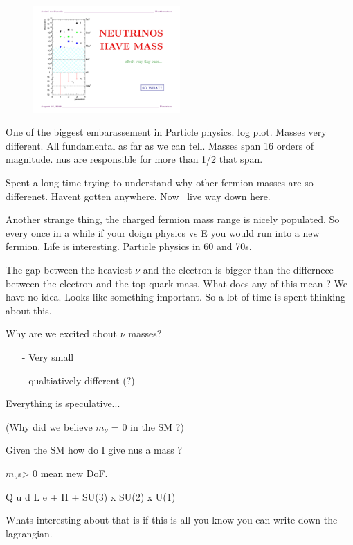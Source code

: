 {\begin{figure}[h!]
\centering
\includegraphics[width=0.5\textwidth]{./NuMass2.pdf}
\end{figure}


One of the biggest embarassement in Particle physics. 
log plot.   Masses very different. 
All fundamental as far as we can tell. 
Masses span 16 orders of magnitude. 
nus are responsible for more than 1/2 that span. 

Spent a long time trying to understand why other fermion masses are so differenet. 
Havent gotten anywhere. 
Now \nus\ live way down here.

Another strange thing, the charged fermion mass range is nicely populated. 
So every once in a while if your doign physics vs E you would run into a new fermion. 
Life is interesting. 
Particle physics in 60 and 70s. 

The gap between the heaviest $\nu$ and the electron is bigger than the differnece between the electron and the top quark mass. 
What does any of this mean ? 
We have no idea.
Looks like something important.
So a lot of time is spent thinking about this.

Why are we excited about $\nu$ masses? 
\begin{itemize}
\item[-] Very small
\item[-] qualtiatively different (?)
\end{itemize}

Everything is speculative...


(Why did we believe $m_\nu$ = 0 in the SM ?)

Given the SM how do I give nus a mass ?

$m_\nu$s> 0 mean new DoF.


Q u d L e  + H + SU(3) x SU(2) x U(1)

Whats interesting about that is if this is all you know you can write down the lagrangian. 

}
